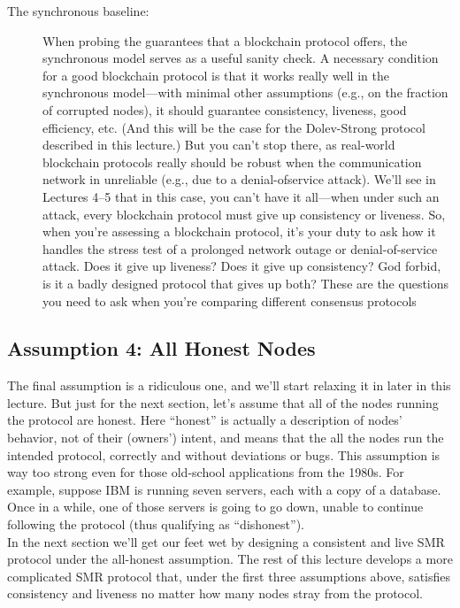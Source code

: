 \begin{description}
    \item[The synchronous baseline:] When probing the guarantees that a blockchain protocol
    offers, the synchronous model serves as a useful sanity check. A necessary condition for a
    good blockchain protocol is that it works really well in the synchronous model—with minimal
    other assumptions (e.g., on the fraction of corrupted nodes), it should guarantee consistency,
    liveness, good efficiency, etc. (And this will be the case for the Dolev-Strong protocol described in this lecture.) But you can’t stop there, as real-world blockchain protocols really
    should be robust when the communication network in unreliable (e.g., due to a denial-ofservice attack). We’ll see in Lectures 4–5 that in this case, you can’t have it all—when under
    such an attack, every blockchain protocol must give up consistency or liveness.
    So, when you’re assessing a blockchain protocol, it’s your duty to ask how it handles the
    stress test of a prolonged network outage or denial-of-service attack. Does it give up liveness?
    Does it give up consistency? God forbid, is it a badly designed protocol that gives up both? These are the
    questions you need to ask when you're
    comparing different consensus protocols
\end{description}


\subsection{Assumption 4: All Honest Nodes}
The final assumption is a ridiculous one, and we’ll start relaxing it in later in this lecture. But just
for the next section, let’s assume that all of the nodes running the protocol are honest. Here
“honest” is actually a description of nodes’ behavior, not of their (owners’) intent, and means
that the all the nodes run the intended protocol, correctly and without deviations or bugs.
This assumption is way too strong even for those old-school applications from the 1980s.
For example, suppose IBM is running seven servers, each with a copy of a database. Once in
a while, one of those servers is going to go down, unable to continue following the protocol
(thus qualifying as “dishonest”).\\
In the next section we’ll get our feet wet by designing a consistent and live SMR protocol
under the all-honest assumption. The rest of this lecture develops a more complicated SMR
protocol that, under the first three assumptions above, satisfies consistency and liveness no
matter how many nodes stray from the protocol.

